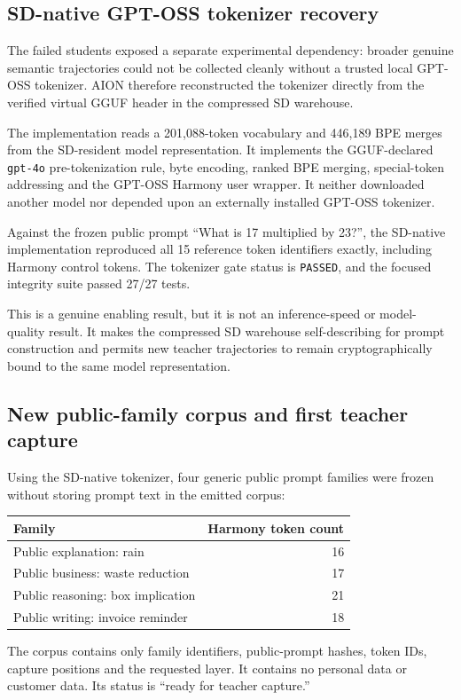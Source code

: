 \subsection{SD-native GPT-OSS tokenizer recovery}

The failed students exposed a separate experimental dependency: broader
genuine semantic trajectories could not be collected cleanly without a trusted
local GPT-OSS tokenizer.  AION therefore reconstructed the tokenizer directly
from the verified virtual GGUF header in the compressed SD warehouse.

The implementation reads a 201,088-token vocabulary and 446,189 BPE merges
from the SD-resident model representation.  It implements the GGUF-declared
\texttt{gpt-4o} pre-tokenization rule, byte encoding, ranked BPE merging,
special-token addressing and the GPT-OSS Harmony user wrapper.  It neither
downloaded another model nor depended upon an externally installed GPT-OSS
tokenizer.

Against the frozen public prompt ``What is 17 multiplied by 23?'', the
SD-native implementation reproduced all 15 reference token identifiers
exactly, including Harmony control tokens.  The tokenizer gate status is
\texttt{PASSED}, and the focused integrity suite passed 27/27 tests.

This is a genuine enabling result, but it is not an inference-speed or model-
quality result.  It makes the compressed SD warehouse self-describing for
prompt construction and permits new teacher trajectories to remain
cryptographically bound to the same model representation.

\subsection{New public-family corpus and first teacher capture}

Using the SD-native tokenizer, four generic public prompt families were frozen
without storing prompt text in the emitted corpus:
\begin{center}
\begin{tabular}{@{}lr@{}}
\toprule
Family & Harmony token count \\
\midrule
Public explanation: rain & 16 \\
Public business: waste reduction & 17 \\
Public reasoning: box implication & 21 \\
Public writing: invoice reminder & 18 \\
\bottomrule
\end{tabular}
\end{center}
The corpus contains only family identifiers, public-prompt hashes, token IDs,
capture positions and the requested layer.  It contains no personal data or
customer data.  Its status is ``ready for teacher capture.''

